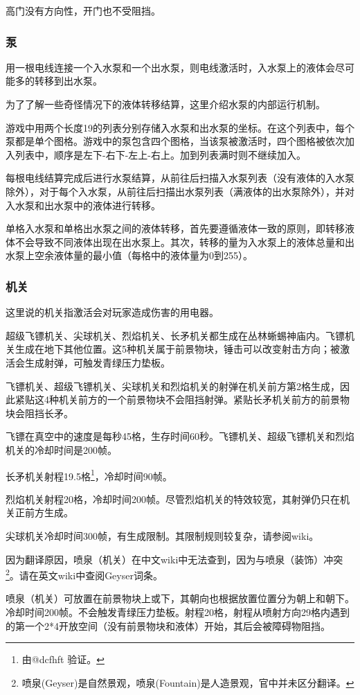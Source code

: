 高门没有方向性，开门也不受阻挡。

\subsubsection{泵}
用一根电线连接一个入水泵和一个出水泵，则电线激活时，入水泵上的液体会尽可能多的转移到出水泵。

为了了解一些奇怪情况下的液体转移结算，这里介绍水泵的内部运行机制。

游戏中用两个长度19的列表分别存储入水泵和出水泵的坐标。在这个列表中，每个泵都是单个图格。游戏中的泵包含四个图格，当该泵被激活时，四个图格被依次加入列表中，顺序是左下-右下-左上-右上。加到列表满时则不继续加入。

每根电线结算完成后进行水泵结算，从前往后扫描入水泵列表（没有液体的入水泵除外），对于每个入水泵，从前往后扫描出水泵列表（满液体的出水泵除外），并对入水泵和出水泵中的液体进行转移。

单格入水泵和单格出水泵之间的液体转移，首先要遵循液体一致的原则，即转移液体不会导致不同液体出现在出水泵上。其次，转移的量为入水泵上的液体总量和出水泵上空余液体量的最小值（每格中的液体量为0到255）。

\subsubsection{机关}
这里说的机关指激活会对玩家造成伤害的用电器。

超级飞镖机关、尖球机关、烈焰机关、长矛机关都生成在丛林蜥蜴神庙内。飞镖机关生成在地下其他位置。这5种机关属于前景物块，锤击可以改变射击方向；被激活会生成射弹，可触发青绿压力垫板。

飞镖机关、超级飞镖机关、尖球机关和烈焰机关的射弹在机关前方第2格生成，因此紧贴这4种机关前方的一个前景物块不会阻挡射弹。紧贴长矛机关前方的前景物块会阻挡长矛。

飞镖在真空中的速度是每秒45格，生存时间60秒。飞镖机关、超级飞镖机关和烈焰机关的冷却时间是200帧。

长矛机关射程19.5格\footnote{由@dcfhft 验证。}，冷却时间90帧。

烈焰机关射程20格，冷却时间200帧。尽管烈焰机关的特效较宽，其射弹仍只在机关正前方生成。

尖球机关冷却时间300帧，有生成限制。其限制规则较复杂，请参阅wiki。

因为翻译原因，喷泉（机关）在中文wiki中无法查到，因为与喷泉（装饰）冲突\footnote{喷泉(Geyser)是自然景观，喷泉(Fountain)是人造景观，官中并未区分翻译。}。请在英文wiki中查阅Geyser词条。

喷泉（机关）可放置在前景物块上或下，其朝向也根据放置位置分为朝上和朝下。冷却时间200帧。不会触发青绿压力垫板。射程20格，射程从喷射方向29格内遇到的第一个2*4开放空间（没有前景物块和液体）开始，其后会被障碍物阻挡。

